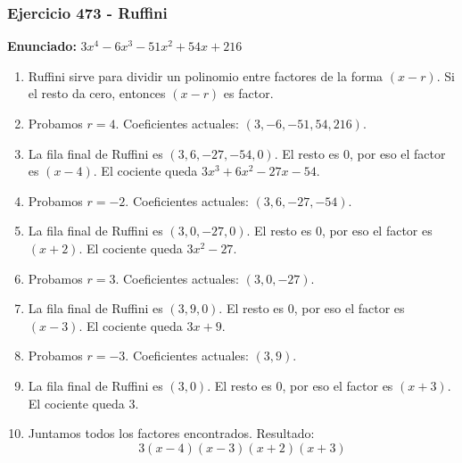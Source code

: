 \documentclass[11pt,a4paper]{article}
\begin{document}
\subsubsection*{Ejercicio 473 - Ruffini}
\textbf{Enunciado:} $ 3 x^{4} - 6 x^{3} - 51 x^{2} + 54 x + 216 $\par
\begin{enumerate}[leftmargin=2em]
\item Ruffini sirve para dividir un polinomio entre factores de la forma \((x-r)\). Si el resto da cero, entonces \((x-r)\) es factor.
\item Probamos \(r=4\). Coeficientes actuales: \((3, -6, -51, 54, 216)\).
\item La fila final de Ruffini es \((3, 6, -27, -54, 0)\). El resto es \(0\), por eso el factor es \((x-4)\). El cociente queda \(3 x^{3} + 6 x^{2} - 27 x - 54\).
\item Probamos \(r=-2\). Coeficientes actuales: \((3, 6, -27, -54)\).
\item La fila final de Ruffini es \((3, 0, -27, 0)\). El resto es \(0\), por eso el factor es \((x+2)\). El cociente queda \(3 x^{2} - 27\).
\item Probamos \(r=3\). Coeficientes actuales: \((3, 0, -27)\).
\item La fila final de Ruffini es \((3, 9, 0)\). El resto es \(0\), por eso el factor es \((x-3)\). El cociente queda \(3 x + 9\).
\item Probamos \(r=-3\). Coeficientes actuales: \((3, 9)\).
\item La fila final de Ruffini es \((3, 0)\). El resto es \(0\), por eso el factor es \((x+3)\). El cociente queda \(3\).
\item Juntamos todos los factores encontrados. Resultado: \[\boxed{3 \left(x - 4\right) \left(x - 3\right) \left(x + 2\right) \left(x + 3\right)}\]
\end{enumerate}

\vspace{0.2cm}
\end{document}
